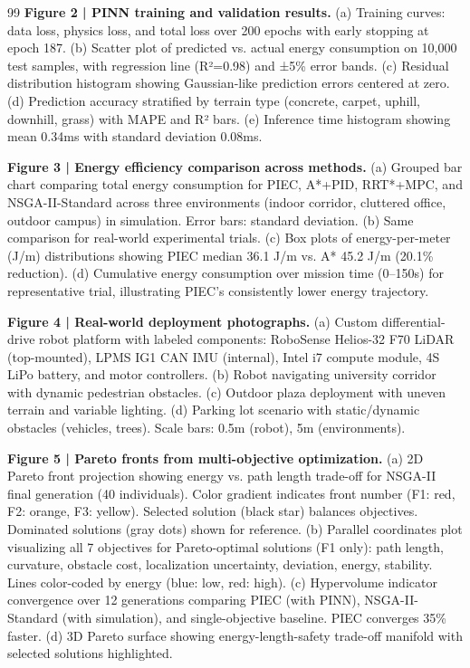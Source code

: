 \documentclass[pdflatex,sn-nature]{sn-jnl}%
\begin{document}
\begin{thebibliography}{99}
\textbf{Figure 2 | PINN training and validation results.} (a) Training curves: data loss, physics loss, and total loss over 200 epochs with early stopping at epoch 187. (b) Scatter plot of predicted vs. actual energy consumption on 10,000 test samples, with regression line (R²=0.98) and ±5\% error bands. (c) Residual distribution histogram showing Gaussian-like prediction errors centered at zero. (d) Prediction accuracy stratified by terrain type (concrete, carpet, uphill, downhill, grass) with MAPE and R² bars. (e) Inference time histogram showing mean 0.34ms with standard deviation 0.08ms.

\textbf{Figure 3 | Energy efficiency comparison across methods.} (a) Grouped bar chart comparing total energy consumption for PIEC, A*+PID, RRT*+MPC, and NSGA-II-Standard across three environments (indoor corridor, cluttered office, outdoor campus) in simulation. Error bars: standard deviation. (b) Same comparison for real-world experimental trials. (c) Box plots of energy-per-meter (J/m) distributions showing PIEC median 36.1 J/m vs. A* 45.2 J/m (20.1\% reduction). (d) Cumulative energy consumption over mission time (0--150s) for representative trial, illustrating PIEC's consistently lower energy trajectory.

\textbf{Figure 4 | Real-world deployment photographs.} (a) Custom differential-drive robot platform with labeled components: RoboSense Helios-32 F70 LiDAR (top-mounted), LPMS IG1 CAN IMU (internal), Intel i7 compute module, 4S LiPo battery, and motor controllers. (b) Robot navigating university corridor with dynamic pedestrian obstacles. (c) Outdoor plaza deployment with uneven terrain and variable lighting. (d) Parking lot scenario with static/dynamic obstacles (vehicles, trees). Scale bars: 0.5m (robot), 5m (environments).

\textbf{Figure 5 | Pareto fronts from multi-objective optimization.} (a) 2D Pareto front projection showing energy vs. path length trade-off for NSGA-II final generation (40 individuals). Color gradient indicates front number (F1: red, F2: orange, F3: yellow). Selected solution (black star) balances objectives. Dominated solutions (gray dots) shown for reference. (b) Parallel coordinates plot visualizing all 7 objectives for Pareto-optimal solutions (F1 only): path length, curvature, obstacle cost, localization uncertainty, deviation, energy, stability. Lines color-coded by energy (blue: low, red: high). (c) Hypervolume indicator convergence over 12 generations comparing PIEC (with PINN), NSGA-II-Standard (with simulation), and single-objective baseline. PIEC converges 35\% faster. (d) 3D Pareto surface showing energy-length-safety trade-off manifold with selected solutions highlighted.

\end{thebibliography}
\end{document}
